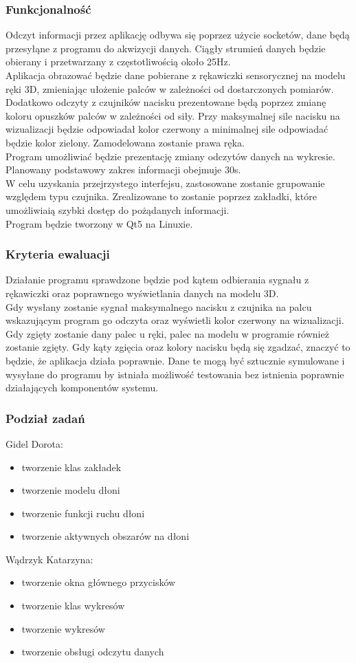 \documentclass{article}
\begin{document}
\subsubsection{Funkcjonalność}
Odczyt informacji przez aplikację odbywa się poprzez użycie socketów, dane będą przesyłąne z programu do akwizycji danych. Ciągły strumień danych będzie obierany i przetwarzany z częstotliwością około 25Hz.\\
Aplikacja obrazować będzie dane pobierane z rękawiczki sensorycznej na modelu ręki 3D, zmieniając ułożenie palców w zależności od dostarczonych pomiarów. Dodatkowo odczyty z czujników nacisku prezentowane będą poprzez zmianę koloru opuszków palców w zależności od siły. Przy maksymalnej sile nacisku na wizualizacji będzie odpowiadał kolor czerwony a minimalnej sile odpowiadać będzie kolor zielony. Zamodelowana zostanie prawa ręka.\\
Program umożliwiać będzie prezentację zmiany odczytów danych na wykresie. Planowany podstawowy zakres informacji obejmuje 30s. \\
W celu uzyskania przejrzystego interfejsu, zastosowane zostanie grupowanie względem typu czujnika. Zrealizowane to zostanie poprzez zakładki, które umożliwiaią szybki dostęp do pożądanych informacji. \\
Program będzie tworzony w Qt5 na Linuxie.
\subsubsection{Kryteria ewaluacji}
Działanie programu sprawdzone będzie pod kątem odbierania sygnału z rękawiczki oraz poprawnego wyświetlania danych na modelu 3D. \\
Gdy wysłany zostanie sygnał maksymalnego nacisku z czujnika na palcu wskazującym program go odczyta oraz wyświetli kolor czerwony na wizualizacji. Gdy zgięty zostanie dany palec u ręki, palec na modelu w programie również zostanie zgięty. Gdy kąty zgięcia oraz kolory nacisku będą się zgadzać, znaczyć to będzie, że aplikacja działa poprawnie. Dane te mogą być sztucznie symulowane i wysyłane do programu by istniała możliwość testowania bez istnienia poprawnie działających komponentów systemu.
\subsubsection{Podział zadań}
Gidel Dorota:
\begin{itemize}
    \item tworzenie klas zakładek
    \item tworzenie modelu dłoni
    \item tworzenie funkcji ruchu dłoni
    \item tworzenie aktywnych obszarów na dłoni
\end{itemize}
Wądrzyk Katarzyna:
\begin{itemize}
    \item tworzenie okna głównego przycisków
    \item tworzenie klas wykresów
    \item tworzenie wykresów
    \item tworzenie obsługi odczytu danych
\end{itemize}
\end{document}
